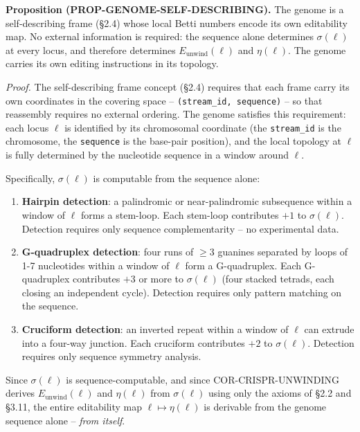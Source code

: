 \documentclass[
  11pt,
]{article}
\begin{document}
\textbf{Proposition (PROP-GENOME-SELF-DESCRIBING).} The genome is a
self-describing frame (§2.4) whose local Betti numbers encode its own
editability map. No external information is required: the sequence alone
determines \(\sigma(\ell)\) at every locus, and therefore determines
\(E_{\text{unwind}}(\ell)\) and \(\eta(\ell)\). The genome carries its
own editing instructions in its topology.

\emph{Proof.} The self-describing frame concept (§2.4) requires that
each frame carry its own coordinates in the covering space --
\texttt{(stream\_id,\ sequence)} -- so that reassembly requires no
external ordering. The genome satisfies this requirement: each locus
\(\ell\) is identified by its chromosomal coordinate (the
\texttt{stream\_id} is the chromosome, the \texttt{sequence} is the
base-pair position), and the local topology at \(\ell\) is fully
determined by the nucleotide sequence in a window around \(\ell\).

Specifically, \(\sigma(\ell)\) is computable from the sequence alone:

\begin{enumerate}
\def\labelenumi{\arabic{enumi}.}
\item
  \textbf{Hairpin detection}: a palindromic or near-palindromic
  subsequence within a window of \(\ell\) forms a stem-loop. Each
  stem-loop contributes \(+1\) to \(\sigma(\ell)\). Detection requires
  only sequence complementarity -- no experimental data.
\item
  \textbf{G-quadruplex detection}: four runs of \(\geq 3\) guanines
  separated by loops of 1-7 nucleotides within a window of \(\ell\) form
  a G-quadruplex. Each G-quadruplex contributes \(+3\) or more to
  \(\sigma(\ell)\) (four stacked tetrads, each closing an independent
  cycle). Detection requires only pattern matching on the sequence.
\item
  \textbf{Cruciform detection}: an inverted repeat within a window of
  \(\ell\) can extrude into a four-way junction. Each cruciform
  contributes \(+2\) to \(\sigma(\ell)\). Detection requires only
  sequence symmetry analysis.
\end{enumerate}

Since \(\sigma(\ell)\) is sequence-computable, and since
COR-CRISPR-UNWINDING derives \(E_{\text{unwind}}(\ell)\) and
\(\eta(\ell)\) from \(\sigma(\ell)\) using only the axioms of §2.2 and
§3.11, the entire editability map \(\ell \mapsto \eta(\ell)\) is
derivable from the genome sequence alone -- \emph{from itself}.
\end{document}
